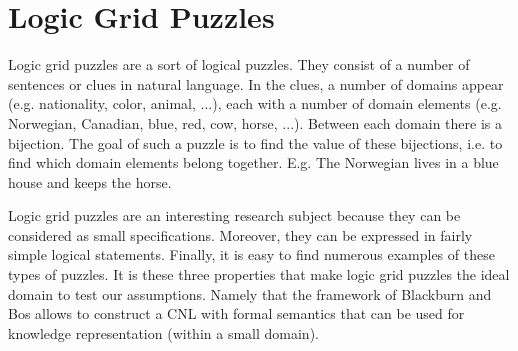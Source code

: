 \section{Logic Grid Puzzles}
Logic grid puzzles are a sort of logical puzzles. They consist of a number of sentences or clues in natural language. In the clues, a number of domains appear (e.g. nationality, color, animal, ...), each with a number of domain elements (e.g. Norwegian, Canadian, blue, red, cow, horse, ...). Between each domain there is a bijection. The goal of such a puzzle is to find the value of these bijections, i.e. to find which domain elements belong together. E.g. The Norwegian lives in a blue house and keeps the horse.

Logic grid puzzles are an interesting research subject because they can be considered as small specifications. Moreover, they can be expressed in fairly simple logical statements. Finally, it is easy to find numerous examples of these types of puzzles. It is these three properties that make logic grid puzzles the ideal domain to test our assumptions. Namely that the framework of Blackburn and Bos allows to construct a CNL with formal semantics that can be used for knowledge representation (within a small domain).
